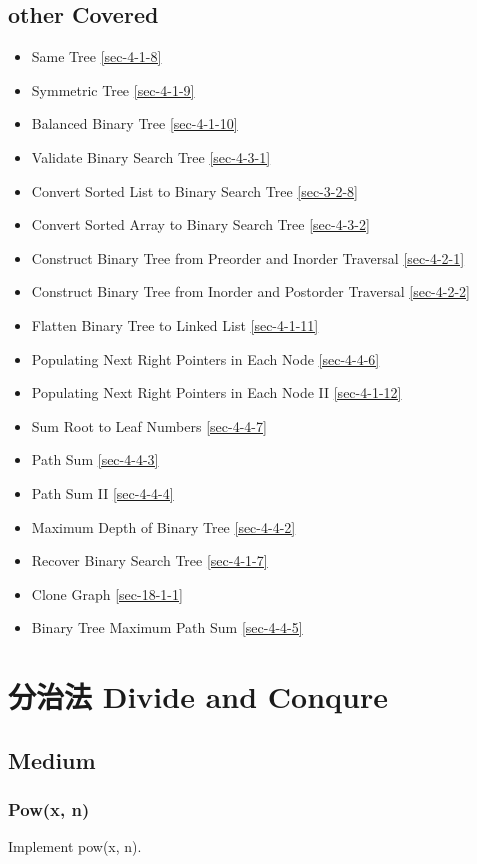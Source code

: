 \documentclass[12pt]{book}
\begin{document}
\section{other Covered}
\label{sec-11-3}
\begin{itemize}
\item Same Tree
\ref{sec-4-1-8}
\item Symmetric Tree
\ref{sec-4-1-9}
\item Balanced Binary Tree
\ref{sec-4-1-10}
\item Validate Binary Search Tree
\ref{sec-4-3-1}
\item Convert Sorted List to Binary Search Tree
\ref{sec-3-2-8}
\item Convert Sorted Array to Binary Search Tree
\ref{sec-4-3-2}
\item Construct Binary Tree from Preorder and Inorder Traversal
\ref{sec-4-2-1}
\item Construct Binary Tree from Inorder and Postorder Traversal
\ref{sec-4-2-2}
\item Flatten Binary Tree to Linked List
\ref{sec-4-1-11}
\item Populating Next Right Pointers in Each Node
\ref{sec-4-4-6}
\item Populating Next Right Pointers in Each Node II
\ref{sec-4-1-12}
\item Sum Root to Leaf Numbers        
\ref{sec-4-4-7}
\item Path Sum
\ref{sec-4-4-3}
\item Path Sum II
\ref{sec-4-4-4}
\item Maximum Depth of Binary Tree
\ref{sec-4-4-2}
\item Recover Binary Search Tree
\ref{sec-4-1-7}
\item Clone Graph
\ref{sec-18-1-1}
\item Binary Tree Maximum Path Sum
\ref{sec-4-4-5}
\end{itemize}
\chapter{分治法 Divide and Conqure}
\label{sec-12}
\section{Medium}
\label{sec-12-1}
\subsection{Pow(x, n)}
\label{sec-12-1-1}
Implement pow(x, n).
\end{document}
